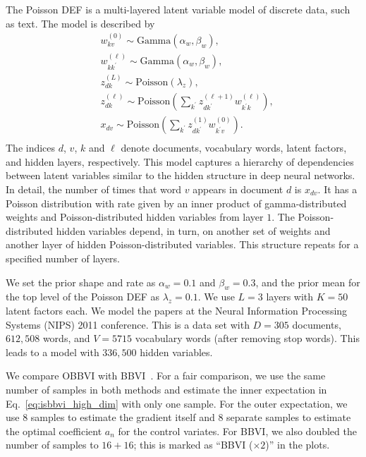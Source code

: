 The Poisson \gls{DEF} \citep{Ranganath2015} is a multi-layered
latent variable model of discrete data, such as text. The model is
described by
\begin{equation}
  \begin{split}
    & w_{kv}^{(0)} \sim \textrm{Gamma}(\alpha_w,\beta_w),\\
    & w_{k k^\prime}^{(\ell)} \sim \textrm{Gamma}(\alpha_w,\beta_w),\\
    & z_{dk}^{(L)} \sim \textrm{Poisson}(\lambda_z),\\
    & z_{dk}^{(\ell)} \sim \textrm{Poisson}\left(\sum_{k^\prime} z_{dk^\prime}^{(\ell+1)} w_{k^\prime k}^{(\ell)}\right),\\
    & x_{dv} \sim \textrm{Poisson}\left(\sum_{k^\prime} z_{dk^\prime}^{(1)} w_{k^\prime v}^{(0)}\right).\\
  \end{split}
\end{equation}
The indices $d$, $v$, $k$ and $\ell$ denote documents, vocabulary
words, latent factors, and hidden layers, respectively. This model
captures a hierarchy of dependencies between latent variables similar
to the hidden structure in deep neural networks. In detail, the number
of times that word $v$ appears in document $d$ is $x_{dv}$. It has a
Poisson distribution with rate given by an inner product of
gamma-distributed weights and Poisson-distributed hidden variables
from layer $1$. The Poisson-distributed hidden variables depend, in
turn, on another set of weights and another layer of hidden
Poisson-distributed variables. This structure repeats for a specified
number of layers.

We set the prior shape and rate as $\alpha_w=0.1$ and $\beta_w=0.3$,
and the prior mean for the top level of the Poisson \gls{DEF} as
$\lambda_z=0.1$. We use $L=3$ layers with $K=50$ latent factors each.
We model the papers at the Neural Information Processing Systems
(NIPS) 2011 conference. This is a data set with $D=305$ documents,
$612,508$ words, and $V=5715$ vocabulary words (after removing stop
words). This leads to a model with $336,500$ hidden variables.


 We compare \gls{OBBVI} with
\gls{BBVI}~\citep{Ranganath2014}. For a fair comparison, we use the
same number of samples in both methods and estimate the inner
expectation in Eq.~\ref{eq:isbbvi_high_dim} with only one sample. For
the outer expectation, we use $8$ samples to estimate the gradient
itself and $8$ separate samples to estimate the optimal coefficient
$a_n$ for the control variates. For \gls{BBVI}, we also doubled the
number of samples to $16+16$; this is marked as ``\gls{BBVI}
($\times 2$)'' in the plots.

